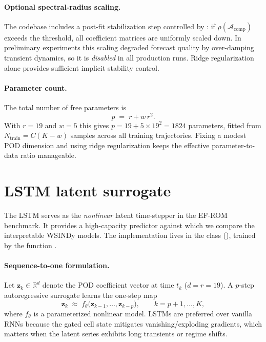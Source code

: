 \documentclass{report}
\theoremstyle{plain}
\theoremstyle{remark}
\numberwithin{equation}{section}              %
\begin{document}
\paragraph{Optional spectral-radius scaling.}
The codebase includes a post-fit stabilization step controlled by
: if
$\rho(\mathcal{A}_{\mathrm{comp}})$ exceeds the threshold, all coefficient
matrices are uniformly scaled down.
In preliminary experiments this scaling degraded forecast quality by
over-damping transient dynamics, so it is \emph{disabled} in all production
runs.
Ridge regularization alone provides sufficient implicit stability control.

\paragraph{Parameter count.}\label{subsec:mvar_identifiability}
The total number of free parameters is
\[
  p \;=\; r + w\,r^2.
\]
With $r=19$ and $w=5$ this gives $p = 19 + 5\times 19^2 = 1824$
parameters, fitted from $N_{\mathrm{train}} = C(K{-}w)$ samples across all
training trajectories.
Fixing a modest POD dimension and using ridge regularization keeps the
effective parameter-to-data ratio manageable.

%
\section{LSTM latent surrogate}
\label{sec:lstm_surrogate}
%

The LSTM serves as the \emph{nonlinear} latent time-stepper in the EF-ROM
benchmark.
It provides a high-capacity predictor against which we compare the
interpretable WSINDy models.
The implementation lives in the class
 (), trained by the function
.

\paragraph{Sequence-to-one formulation.}
Let $\mathbf{z}_k\in\mathbb{R}^d$ denote the POD coefficient vector at
time $t_k$ ($d = r = 19$).
A $p$-step autoregressive surrogate learns the one-step map
\begin{equation}\label{eq:lstm_seq_problem}
  \mathbf{z}_{k} \;\approx\;
  f_\theta\!\bigl(\mathbf{z}_{k-1},\ldots,\mathbf{z}_{k-p}\bigr),
  \qquad k = p{+}1,\ldots,K,
\end{equation}
where $f_\theta$ is a parameterized nonlinear model.
LSTMs are preferred over vanilla RNNs because the gated cell state
mitigates vanishing/exploding gradients, which matters when the latent
series exhibits long transients or regime shifts.
\end{document}

